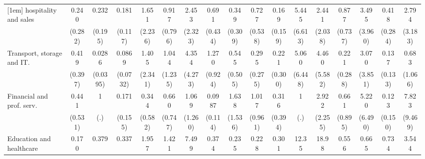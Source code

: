 {\begin{tabular}{l*{16}{c}}
[1em]
hospitality and sales&       0.240         &       0.232         &       0.181\sym{**} &       1.651         &       0.917         &       2.453         &       0.691         &       0.349         &       0.727         &       0.169         &       5.445         &       2.441         &       0.877         &       3.495         &       0.418         &       2.794         \\
                    &     (0.282)         &     (0.195)         &     (0.117)         &     (2.236)         &     (0.796)         &     (2.323)         &     (0.434)         &     (0.309)         &     (0.538)         &     (0.159)         &     (6.613)         &     (2.038)         &     (0.737)         &     (3.960)         &     (0.284)         &     (3.183)         \\
[1em]
Transport, storage and IT.&       0.419         &      0.0286\sym{*}  &      0.0869\sym{**} &       1.405         &       1.044         &       4.354         &       1.270         &       0.545         &       0.295         &       0.221         &       5.060         &       4.460         &       0.221         &       3.070         &       0.137\sym{*}  &       0.683         \\
                    &     (0.397)         &    (0.0395)         &    (0.0732)         &     (2.341)         &     (1.235)         &     (4.273)         &     (0.924)         &     (0.505)         &     (0.275)         &     (0.300)         &     (6.448)         &     (5.582)         &     (0.288)         &     (3.851)         &     (0.133)         &     (1.066)         \\
[1em]
Financial and prof. serv.&       0.441         &           1         &       0.171         &       0.344         &       0.660         &       1.069         &      0.0987\sym{*}  &       1.638         &       1.017         &       0.316         &           1         &       2.922         &       0.661         &       5.220         &       0.123         &       7.823         \\
                    &     (0.531)         &         (.)         &     (0.155)         &     (0.582)         &     (0.747)         &     (1.260)         &     (0.114)         &     (1.536)         &     (0.961)         &     (0.394)         &         (.)         &     (2.255)         &     (0.895)         &     (6.490)         &     (0.150)         &     (9.469)         \\
[1em]
Education and healthcare&       0.170         &       0.379         &       0.337         &       1.957         &       1.421         &       7.499\sym{*}  &       0.374         &       0.235         &       0.228         &       0.301         &       12.35\sym{*}  &       18.98\sym{**} &       0.556         &       0.665         &       0.734         &       3.544         \\

\end{tabular}}
